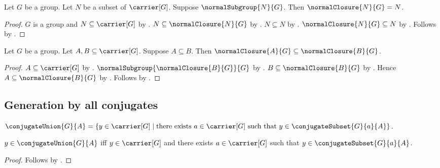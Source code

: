 \begin{corollary}\label{normal_closure_of_normal_subgroup}
    Let $G$ be a group.
    Let $N$ be a subset of $\carrier[G]$.
    Suppose $\normalSubgroup{N}{G}$.
    Then $\normalClosure{N}{G}=N$.
\end{corollary}
\begin{proof}
    $G$ is a group and $N\subseteq\carrier[G]$ by
        .
    $N\subseteq\normalClosure{N}{G}$ by
        .
    $N\subseteq N$ by .
    $\normalClosure{N}{G}\subseteq N$ by
        .
    Follows by .
\end{proof}

\begin{proposition}\label{normal_closure_monotone}
    Let $G$ be a group.
    Let $A,B\subseteq\carrier[G]$.
    Suppose $A\subseteq B$.
    Then $\normalClosure{A}{G}\subseteq\normalClosure{B}{G}$.
\end{proposition}
\begin{proof}
    $A\subseteq\carrier[G]$ by .
    $\normalSubgroup{\normalClosure{B}{G}}{G}$ by
        .
    $B\subseteq\normalClosure{B}{G}$ by
        .
    Hence $A\subseteq\normalClosure{B}{G}$ by
        .
    Follows by .
\end{proof}

\subsection{Generation by all conjugates}

\begin{definition}\label{conjugate_union}
    $\conjugateUnion{G}{A}=
        \{y\in\carrier[G]\mid
            \text{there exists $a\in\carrier[G]$ such that
                $y\in\conjugateSubset{G}{a}{A}$}\}$.
\end{definition}

\begin{proposition}\label{conjugate_union_iff}
    $y\in\conjugateUnion{G}{A}$ iff
        $y\in\carrier[G]$ and
        there exists $a\in\carrier[G]$ such that
            $y\in\conjugateSubset{G}{a}{A}$.
\end{proposition}
\begin{proof}
    Follows by .
\end{proof}

